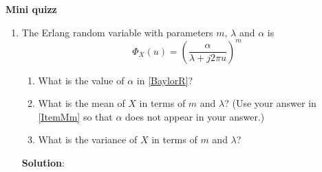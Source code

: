 \textbf{Mini quizz}
\begin{enumerate}[1]


\item
  The Erlang random variable with parameters $m$, $\lambda$ and $\alpha$ is
  \begin{equation}
    \Phi_X (u) = \left( \frac{\alpha }{\lambda + j2\pi u}    \right)^m
    \label{BaylorR}
  \end{equation}
  \begin{enumerate}
  \item What is the value of $\alpha$ in \eqref{BaylorR}?
    \label{ItemMm}
  \item What is the mean of $X$ in terms of $m$ and $\lambda$? (Use your answer in \ref{ItemMm} so that $\alpha$ does not appear in your answer.)
  \item What is the variance of $X$ in terms of $m$ and $\lambda$?
  \end{enumerate}

  {\bf Solution}:

\end{enumerate}
